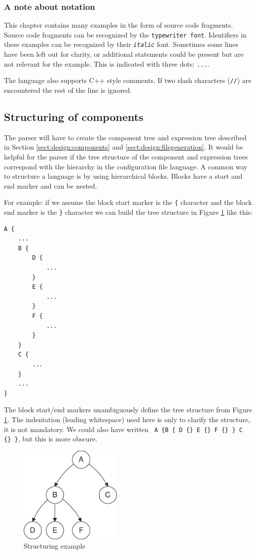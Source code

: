 \bigskip \noindent
\subsubsection*{A note about notation}
This chapter contains many examples in the form of source code fragments.
Source code fragments can be recognized by the
\verb=typewriter font=. Identifiers in these examples can be recognized by their
\texttt{\emph{italic}} font. Sometimes some lines have been left out for
clarity, or additional statements could be present but are not relevant for the
example. This is indicated with three dots: \verb=...=.

The language also supports C++ style comments. If two slash characters
(\verb=//=) are encountered the rest of the line is ignored.

\subsection{Structuring of components} \label{sect:language:structuring}
The parser will have to create the component tree and expression tree described
in Section \ref{sect:design:components} and \ref{sect:design:filegeneration}.
It would be helpful for the parser if the tree structure of the component and
expression trees correspond with the hierarchy in the configuration file
language. A common way to structure a language is by using hierarchical blocks.
Blocks have a start and end marker and can be nested.

For example: if we assume the block start marker is the \verb={= character and
the block end marker is the \verb=}= character we can build the tree structure
in Figure \ref{fig:language:tree_example} like this:
\begin{verbatim}
A {
    ...
    B {
        D {
            ...
        }
        E {
            ...
        }
        F {
            ...
        }
    }
    C {
        ...
    }
    ...
}
\end{verbatim}
The block start/end markers unambiguously define the tree structure from Figure
\ref{fig:language:tree_example}. The indentation (leading whitespace) used here
is only to clarify the structure, it is not mandatory. We could also have
written \verb= A {B { D {} E {} F {} } C {} }=, but this is more obscure.


\begin{figure} \begin{center}
\includegraphics[width=5cm]{./figures/language_tree_example.eps}
\caption{Structuring example}
\label{fig:language:tree_example}
\end{center} \end{figure}

